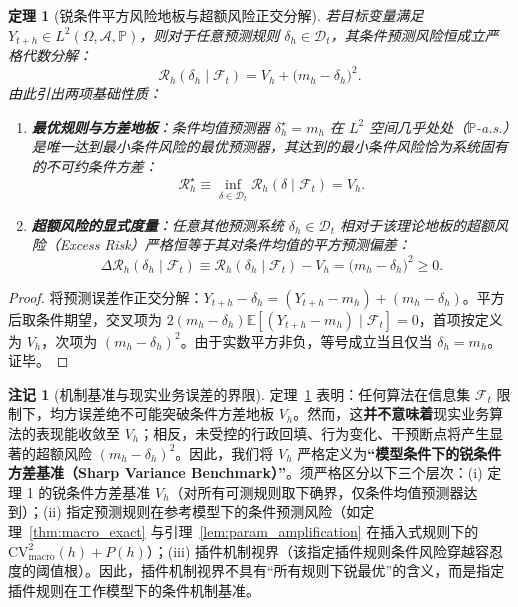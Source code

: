 \documentclass[10pt,a4paper]{article}
\theoremstyle{plain}
\newtheorem{theorem}{定理}
\theoremstyle{definition}
\newtheorem*{remark}{注记}
\begin{document}
\begin{theorem}[锐条件平方风险地板与超额风险正交分解]\label{thm:sharp_floor}
若目标变量满足 $Y_{t+h} \in L^2(\Omega, \mathcal{A}, \mathbb{P})$，则对于任意预测规则 $\delta_h \in \mathcal{D}_t$，其条件预测风险恒成立严格代数分解：
\begin{equation}
\mathcal{R}_h(\delta_h \mid \mathcal{F}_t) = V_h + \bigl(m_h - \delta_h\bigr)^2. \label{eq:sharp_floor_identity}
\end{equation}
由此引出两项基础性质：
\begin{enumerate}
\item \textbf{最优规则与方差地板}：条件均值预测器 $\delta_h^\star = m_h$ 在 $L^2$ 空间几乎处处（$\mathbb{P}$-a.s.）是唯一达到最小条件风险的最优预测器，其达到的最小条件风险恰为系统固有的不可约条件方差：
\begin{equation}
\mathcal{R}_h^\star \equiv \inf_{\delta \in \mathcal{D}_t} \mathcal{R}_h(\delta \mid \mathcal{F}_t) = V_h. \label{eq:sharp_floor_min}
\end{equation}
\item \textbf{超额风险的显式度量}：任意其他预测系统 $\delta_h \in \mathcal{D}_t$ 相对于该理论地板的超额风险（Excess Risk）严格恒等于其对条件均值的平方预测偏差：
\begin{equation}
\Delta \mathcal{R}_h(\delta_h \mid \mathcal{F}_t) \equiv \mathcal{R}_h(\delta_h \mid \mathcal{F}_t) - V_h = \bigl(m_h - \delta_h\bigr)^2 \ge 0. \label{eq:sharp_floor_excess}
\end{equation}
\end{enumerate}
\end{theorem}

\begin{proof}
将预测误差作正交分解：$Y_{t+h} - \delta_h = (Y_{t+h} - m_h) + (m_h - \delta_h)$。平方后取条件期望，交叉项为 $2(m_h - \delta_h)\mathbb{E}[(Y_{t+h} - m_h)\mid\mathcal{F}_t] = 0$，首项按定义为 $V_h$，次项为 $(m_h - \delta_h)^2$。由于实数平方非负，等号成立当且仅当 $\delta_h = m_h$。证毕。
\end{proof}

\begin{remark}[机制基准与现实业务误差的界限]\label{rem:sharp_floor}
定理~\ref{thm:sharp_floor} 表明：任何算法在信息集 $\mathcal{F}_t$ 限制下，均方误差绝不可能突破条件方差地板 $V_h$。然而，这\textbf{并不意味着}现实业务算法的表现能收敛至 $V_h$；相反，未受控的行政回填、行为变化、干预断点将产生显著的超额风险 $(m_h - \delta_h)^2$。因此，我们将 $V_h$ 严格定义为\textbf{“模型条件下的锐条件方差基准（Sharp Variance Benchmark）”}。须严格区分以下三个层次：(i) 定理 1 的锐条件方差基准 $V_h$（对所有可测规则取下确界，仅条件均值预测器达到）；(ii) 指定预测规则在参考模型下的条件预测风险（如定理~\ref{thm:macro_exact} 与引理~\ref{lem:param_amplification} 在插入式规则下的 $\text{CV}^2_{\text{macro}}(h) + P(h)$）；(iii) 插件机制视界（该指定插件规则条件风险穿越容忍度的阈值根）。因此，插件机制视界不具有“所有规则下锐最优”的含义，而是指定插件规则在工作模型下的条件机制基准。
\end{remark}
\end{document}
